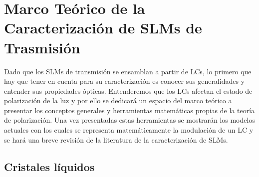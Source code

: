 

\section{Marco Teórico de la Caracterización de SLMs de Trasmisión}
\label{sec:ChGen_marco_teorico}

Dado que los SLMs de transmisión se ensamblan a partir de LCs, lo
primero que hay que tener en cuenta para su caracterización 
es conocer sus generalidades y entender sus propiedades ópticas. 
Entenderemos que los LCs afectan el estado de polarización de la luz y
por ello se dedicará un espacio del marco teórico a presentar los conceptos
generales y herramientas matemáticas propias de la teoría de polarización. 
Una vez presentadas estas herramientas se mostrarán los modelos
actuales con los cuales se representa matemáticamente la modulación de
un LC y se hará una breve revisión de la literatura de la
caracterización de SLMs. 

\subsection{Cristales líquidos}
